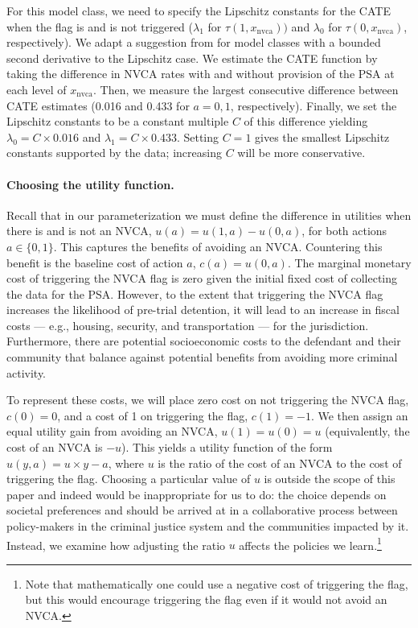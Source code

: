 \documentclass[12pt]{article}
\theoremstyle{definition}
\newcommand{\<}{\langle}
\renewcommand{\>}{\rangle}
\begin{document}
For this model class, we need to specify the Lipschitz constants for
the CATE when the flag is and is not triggered ($\lambda_1$ for
$\tau(1,x_\text{nvca}))$ and $\lambda_0$ for $\tau(0, x_\text{nvca})$,
respectively).  We adapt a suggestion from \citet{Imbens2019_optrdd}
for model classes with a bounded second derivative to the Lipschitz
case.  We estimate the CATE function by taking the difference in NVCA
rates with and without provision of the PSA at each level of
$x_\text{nvca}$. Then, we measure the largest consecutive difference
between CATE estimates (0.016 and 0.433 for $a = 0, 1$, respectively).
Finally, we set the Lipschitz constants to be a constant multiple $C$
of this difference yielding $\lambda_0 = C \times 0.016$ and
$\lambda_1 = C \times 0.433$.
Setting $C = 1$ gives the smallest Lipschitz constants supported by the data;
increasing $C$ will be more conservative.


\paragraph{Choosing the utility function.}
Recall that in our parameterization we must define the difference in
utilities when there is and is not an NVCA, $u(a) = u(1,a) - u(0,a)$,
for both actions $a \in \{0,1\}$.
This captures the benefits of avoiding an NVCA.
Countering this benefit is the baseline cost of action $a$, $c(a) = u(0,a)$.
The marginal monetary cost of  triggering the NVCA flag is zero
given the initial fixed cost of collecting the data for the PSA.
However, to the extent
that triggering the NVCA flag increases the likelihood of pre-trial
detention, it will lead to an increase in fiscal costs --- e.g.,
housing, security, and transportation --- for the
jurisdiction. Furthermore, there are potential socioeconomic costs to
the defendant and their community that balance against potential benefits from
avoiding more criminal activity.

To represent these costs, we will place zero cost on not triggering
the NVCA flag, $c(0) = 0$, and a cost of 1 on triggering the flag,
$c(1) = -1$. We then assign an equal utility gain from avoiding an
NVCA, $u(1) = u(0) = u$ (equivalently, the cost of an NVCA is $-u$).
This yields a utility function of the form $u(y,a) = u \times y - a$,
where $u$ is the ratio of the cost of an NVCA to the cost of
triggering the flag.  Choosing a particular value of $u$ is outside
the scope of this paper and indeed would be inappropriate for us to
do: the choice depends on societal preferences and should be arrived
at in a collaborative process between policy-makers in the criminal
justice system and the communities impacted by it.  Instead, we
examine how adjusting the ratio $u$ affects the policies we learn.\footnote{
Note that mathematically one could use a negative cost
of triggering the flag, but this would encourage triggering the flag even if
it would not avoid an NVCA.}
\end{document}
